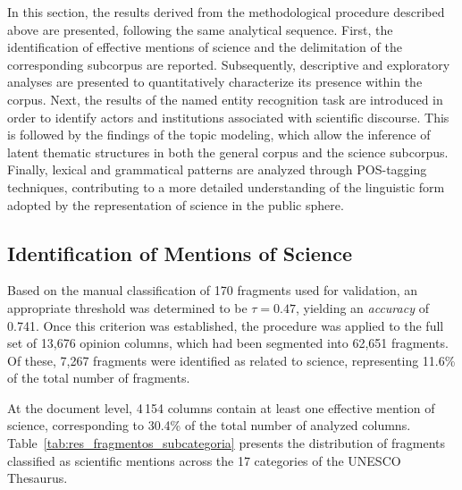 \documentclass[11pt,a4paper]{article}
\begin{document}
In this section, the results derived from the methodological procedure described above are presented, following the same analytical sequence. First, the identification of effective mentions of science and the delimitation of the corresponding subcorpus are reported. Subsequently, descriptive and exploratory analyses are presented to quantitatively characterize its presence within the corpus. Next, the results of the named entity recognition task are introduced in order to identify actors and institutions associated with scientific discourse. This is followed by the findings of the topic modeling, which allow the inference of latent thematic structures in both the general corpus and the science subcorpus. Finally, lexical and grammatical patterns are analyzed through POS-tagging techniques, contributing to a more detailed understanding of the linguistic form adopted by the representation of science in the public sphere.


	
\subsection{Identification of Mentions of Science}\label{sec:ident_menciones}


Based on the manual classification of 170 fragments used for validation, an appropriate threshold was determined to be $\tau = 0.47$, yielding an \emph{accuracy} of 0.741. Once this criterion was established, the procedure was applied to the full set of 13,676 opinion columns, which had been segmented into 62,651 fragments. Of these, 7,267 fragments were identified as related to science, representing 11.6\% of the total number of fragments.


At the document level, 4\,154 columns contain at least one effective mention of science, corresponding to 30.4\% of the total number of analyzed columns. Table~\ref{tab:res_fragmentos_subcategoria} presents the distribution of fragments classified as scientific mentions across the 17 categories of the UNESCO Thesaurus.

	
	
\end{document}
